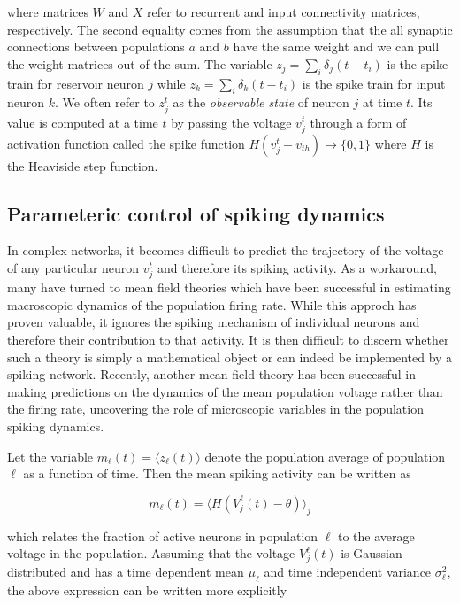 \documentclass{article} %
\begin{document}
where matrices $W$ and $X$ refer to recurrent and input connectivity matrices, respectively. The second equality comes from the assumption that the all synaptic connections between populations $a$ and $b$ have the same weight and we can pull the weight matrices out of the sum. The variable $z_{j} = \sum_{i} \delta_{j} (t-t_{i})$ is the spike train for reservoir neuron $j$ while $z_{k} = \sum_{i} \delta_{k} (t-t_{i})$ is the spike train for input neuron $k$. We often refer to $z_{j}^{t}$ as the \emph{observable state} of neuron $j$ at time $t$. Its value is computed at a time $t$ by passing the voltage $v_{j}^{t}$ through a form of activation function called the spike function $H(v_{j}^{t} - v_{th}) \rightarrow \{0,1\}$ where $H$ is the Heaviside step function.

\subsection{Parameteric control of spiking dynamics}

In complex networks, it becomes difficult to predict the trajectory of the voltage of any particular neuron $v_{j}^{t}$ and therefore its spiking activity. As a workaround, many have turned to mean field theories which have been successful in estimating macroscopic dynamics of the population firing rate. While this approch has proven valuable, it ignores the spiking mechanism of individual neurons and therefore their contribution to that activity. It is then difficult to discern whether such a theory is simply a mathematical object or can indeed be implemented by a spiking network. Recently, another mean field theory has been successful in making predictions on the dynamics of the mean population voltage rather than the firing rate, uncovering the role of microscopic variables in the population spiking dynamics. 

Let the variable $m_{\ell}(t) = \langle z_{\ell}(t) \rangle$ denote the population average of population $\ell$ as a function of time. Then the mean spiking activity can be written as

\begin{equation*}
m_{\ell}(t) = \langle H(V_{j}^{\ell}(t) - \theta)\rangle_{j}
\end{equation*}

which relates the fraction of active neurons in population $\ell$ to the average voltage in the population. Assuming that the voltage $V_{j}^{\ell}(t)$ is Gaussian distributed and has a time dependent mean $\mu_{\ell}$ and time independent variance $\sigma_{\ell}^{2}$, the above expression can be written more explicitly
\end{document}
